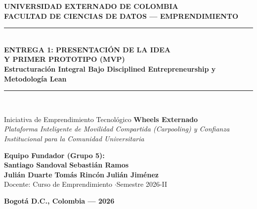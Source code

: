 \documentclass[11pt,a4paper]{article}
\begin{document}
\begin{titlepage}
    \centering
    \vspace*{0.5cm}
    {\Huge \textbf{\color{primary} UNIVERSIDAD EXTERNADO DE COLOMBIA}}\\[0.3cm]
    {\Large \textbf{\color{secondary} FACULTAD DE CIENCIAS DE DATOS --- EMPRENDIMIENTO}}\\[1.5cm]
    
    \rule{\linewidth}{0.8mm}\\[0.4cm]
    {\Huge \textbf{ENTREGA 1: PRESENTACIÓN DE LA IDEA}}\\[0.2cm]
    {\Huge \textbf{Y PRIMER PROTOTIPO (MVP)}}\\[0.3cm]
    {\Large \textbf{Estructuración Integral Bajo Disciplined Entrepreneurship y Metodología Lean}}\\[0.4cm]
    \rule{\linewidth}{0.8mm}\\[1.2cm]
    
    \begin{externadobox}[colback=white,colframe=primary]{Iniciativa de Emprendimiento Tecnológico}
        \centering \vspace{0.2cm}
        {\Huge \textbf{\color{primary} Wheels Externado}}\\[0.3cm]
        {\large \textit{Plataforma Inteligente de Movilidad Compartida (Carpooling) y Confianza Institucional para la Comunidad Universitaria}}\\[0.2cm]
    \end{externadobox}
    
    \vfill
    
    \begin{minipage}{0.85\textwidth}
        \centering
        \textbf{\large Equipo Fundador (Grupo 5):}\\[0.3cm]
        \textbf{Santiago Sandoval} \quad\vert\quad \textbf{Sebastián Ramos}\\[0.15cm]
        \textbf{Julián Duarte} \quad\vert\quad \textbf{Tomás Rincón} \quad\vert\quad \textbf{Julián Jiménez}\\[0.4cm]
        {\small Docente: Curso de Emprendimiento \quad$\cdot$\quad Semestre 2026-II}
    \end{minipage}
    
    \vfill
    {\large \textbf{Bogotá D.C., Colombia --- 2026}}
\end{titlepage}
\end{document}
